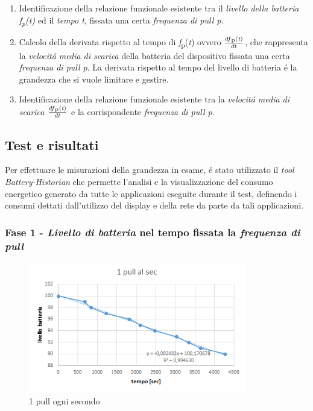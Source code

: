 \documentclass{article}
\begin{document}
\begin{enumerate}
\item{Identificazione della relazione funzionale esistente tra il \textit{livello della batteria \textit{f}\textsubscript{p}(\textit{t})} ed il \textit{tempo t}, fissata una certa \textit{frequenza di pull p}.}
\item{Calcolo della derivata rispetto al tempo di \textit{f}\textsubscript{p}(\textit{t}) ovvero \(\frac{df\textsubscript{p}(\textit{t})}{dt}\), che rappresenta la \textit{velocit\'a media di scarica} della batteria del dispositivo fissata una certa \textit{frequenza di pull p}. La derivata rispetto al tempo del livello di batteria \'e la grandezza che si vuole limitare e gestire.}
\item{Identificazione della relazione funzionale esistente tra la \textit{velocit\'a media di scarica \(\frac{df\textsubscript{p}(\textit{t})}{dt}\)} e la corrispondente \textit{frequenza di pull p}.}
\end{enumerate} 

\subsection{Test e risultati}

Per effettuare le misurazioni della grandezza in esame, \'e stato utilizzato il \textit{tool Battery-Historian} che permette l'analisi e la visualizzazione del consumo energetico generato da tutte le applicazioni eseguite durante il test, definendo i consumi dettati dall'utilizzo del display e della rete da parte da tali applicazioni.

\subsubsection{Fase 1 - \textit{Livello di batteria} nel tempo fissata la \textit{frequenza di pull}}

\begin{figure}[h]
\begin{center}
\centering
\includegraphics[width=0.85\textwidth]{1alsec.jpg} %
\caption{1 pull ogni secondo}
\label{fig:1 pull ogni secondo}
\end{center}
\end{figure}
\end{document}
